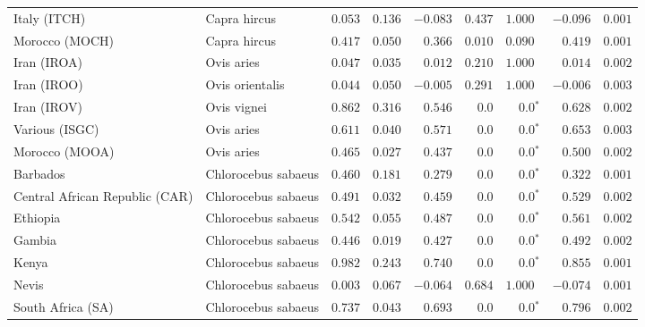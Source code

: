 \begin{center}
\begin{adjustbox}{width = 1\textwidth}
\begin{tabular}{|l|l|r|r|r|r|r|r|r|}
            Italy (ITCH)                    & Capra hircus          & $ 0.053$ & $ 0.136$ & $-0.083$ & $ 0.437$ & $ 1.000~~$     & $-0.096$ & $ 0.001$  \\
            Morocco (MOCH)                    & Capra hircus     & $ 0.417$ & $ 0.050$ & $ 0.366$ & $ 0.010$ & $ 0.090~~$     & $ 0.419$ & $ 0.001$ \\
            Iran (IROA)                    & Ovis aries         & $ 0.047$ & $ 0.035$ & $ 0.012$ & $ 0.210$    & $ 1.000~~$ & $ 0.014$ & $ 0.002$ \\
            Iran (IROO)                 & Ovis orientalis          & $ 0.044$ & $ 0.050$ & $-0.005$ & $ 0.291$    & $ 1.000~~$ & $-0.006$ & $ 0.003$ \\
            Iran (IROV)                 & Ovis vignei          & $ 0.862$ & $ 0.316$ & $ 0.546$ & $0.0$    & $\bm{0.0{^*}}$ & $ 0.628$ & $ 0.002$ \\
            Various (ISGC)                       & Ovis aries & $ 0.611$ & $ 0.040$ & $ 0.571$ & $0.0$    & $\bm{0.0{^*}}$ & $ 0.653$ & $ 0.003$ \\
            Morocco (MOOA) & Ovis aries & $ 0.465$ & $ 0.027$ & $ 0.437$ & $0.0$ & $\bm{0.0{^*}}$ & $ 0.500$ & $ 0.002$ \\
            Barbados                       & Chlorocebus sabaeus & $ 0.460$ & $ 0.181$ & $ 0.279$ & $0.0$    & $\bm{0.0{^*}}$ & $ 0.322$ & $ 0.001$ \\
            Central African Republic (CAR)                         & Chlorocebus sabaeus & $ 0.491$ & $ 0.032$ & $ 0.459$ & $0.0$    & $\bm{0.0{^*}}$ & $ 0.529$ & $ 0.002$ \\
            Ethiopia                          & Chlorocebus sabaeus & $ 0.542$ & $ 0.055$ & $ 0.487$ & $0.0$    & $\bm{0.0{^*}}$ & $ 0.561$ & $ 0.002$ \\
            Gambia                          & Chlorocebus sabaeus & $ 0.446$ & $ 0.019$ & $ 0.427$ & $0.0$ & $\bm{0.0{^*}}$     & $ 0.492$ & $ 0.002$ \\
            Kenya              & Chlorocebus sabaeus & $ 0.982$ & $ 0.243$ & $ 0.740$ & $0.0$    & $\bm{0.0{^*}}$ & $ 0.855$ & $ 0.001$ \\
            Nevis               & Chlorocebus sabaeus & $ 0.003$ & $ 0.067$ & $-0.064$ & $ 0.684$    & $ 1.000~~$ & $-0.074$ & $ 0.001$ \\
            South Africa (SA)                         & Chlorocebus sabaeus & $ 0.737$ & $ 0.043$ & $ 0.693$ & $0.0$    & $\bm{0.0{^*}}$ & $ 0.796$ & $ 0.002$ \\

\end{tabular}
\end{adjustbox}
\end{center}
